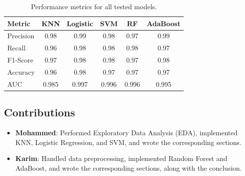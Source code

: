 \documentclass[12pt]{article}
\begin{document}
\begin{table}[h!]
\centering
\begin{tabular}{|l|c|c|c|c|c|}
\hline
\textbf{Metric}   & \textbf{KNN} & \textbf{Logistic} & \textbf{SVM} & \textbf{RF} & \textbf{AdaBoost} \\ \hline
Precision         & 0.98         & 0.99              & 0.98         & 0.97        & 0.99              \\ \hline
Recall            & 0.96         & 0.98              & 0.98         & 0.98        & 0.97              \\ \hline
F1-Score          & 0.97         & 0.98              & 0.98         & 0.97        & 0.98              \\ \hline
Accuracy          & 0.96         & 0.98              & 0.97         & 0.97        & 0.97              \\ \hline
AUC               & 0.985        & 0.997             & 0.996        & 0.996       & 0.995             \\ \hline
\end{tabular}
\caption{Performance metrics for all tested models.}
\label{tab:model_metrics}
\end{table}
\printbibliography
\begin{appendices}
\section{Contributions}
\begin{itemize}
    \item \textbf{Mohammed}: Performed Exploratory Data Analysis (EDA), implemented KNN, Logistic Regression, and SVM, and wrote the corresponding sections.
    \item \textbf{Karim}: Handled data preprocessing, implemented Random Forest and AdaBoost, and wrote the corresponding sections, along with the conclusion.
\end{itemize}
\end{appendices}
\end{document}
